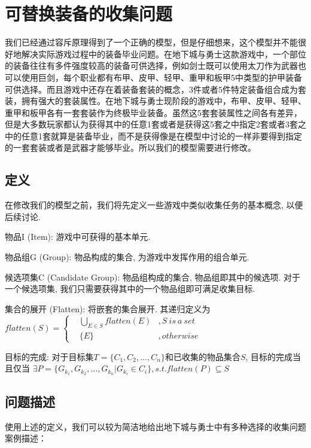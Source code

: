 \documentclass[10pt,journal,compsoc]{IEEEtran}
\begin{document}
\section{可替换装备的收集问题}
  我们已经通过容斥原理得到了一个正确的模型，但是仔细想来，这个模型并不能很好地解决实际游戏过程中的装备毕业问题。在地下城与勇士这款游戏中，一个部位的装备往往有多件强度较高的装备可供选择，例如剑士既可以使用太刀作为武器也可以使用巨剑，每个职业都有布甲、皮甲、轻甲、重甲和板甲5中类型的护甲装备可供选择。而且游戏中还存在着装备套装的概念，3件或者5件特定装备组合成为套装，拥有强大的套装属性。在地下城与勇士现阶段的游戏中，布甲、皮甲、轻甲、重甲和板甲各有一套套装作为终极毕业装备。虽然这5套套装属性之间各有差异，但是大多数玩家都认为获得其中的任意1套或者是获得这5套之中指定2套或者3套之中的任意1套就算是装备毕业，而不是获得像是在模型中讨论的一样非要得到指定的一套套装或者是武器才能够毕业。所以我们的模型需要进行修改。

  \subsection{定义}

  在修改我们的模型之前，我们将先定义一些游戏中类似收集任务的基本概念, 以便后续讨论. 
  
  物品I (Item): 游戏中可获得的基本单元.

  物品组G (Group): 物品构成的集合, 为游戏中发挥作用的组合单元.
  
  候选项集C (Candidate Group): 物品组构成的集合, 物品组即其中的候选项. 对于一个候选项集, 我们只需要获得其中的一个物品组即可满足收集目标. 
  

  集合的展开 (Flatten): 将嵌套的集合展开. 其递归定义为
  $
  flatten(S) = \left\{
    \begin{aligned}
      & \bigcup\limits_{E \in S} flatten(E) &, S~is~a~set \\
      & \{E\} &, otherwise
    \end{aligned}
  \right.
  $

  目标的完成: 对于目标集$T = \{C_1, C_2, \dots, C_n\}$和已收集的物品集合$S$, 目标的完成当且仅当
  $ \exists P = \{G_{k_1}, G_{k_2}, \dots, G_{k_n} | G_{k_i} \in C_i\}, s.t. flatten(P) \subseteq S$
  
  \vspace{5mm}

  \subsection{问题描述}
  使用上述的定义，我们可以较为简洁地给出地下城与勇士中有多种选择的收集问题案例描述：
  
\end{document}
